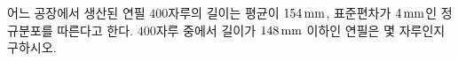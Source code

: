 어느 공장에서 생산된 연필 $400$자루의 길이는 평균이 $154\mkern3mu \mathrm{mm}$, 표준편차가 $4\mkern3mu \mathrm{mm}$인 정규분포를 따른다고 한다. $400$자루 중에서 길이가 $148\mkern3mu \mathrm{mm}$ 이하인 연필은 몇 자루인지 구하시오. 
